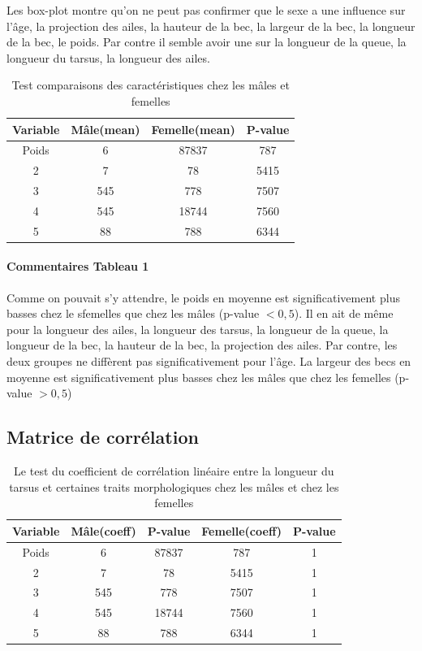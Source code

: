 \documentclass[12pt, twocolumn]{article}
\begin{document}
Les box-plot montre qu'on ne peut pas confirmer que le sexe a une influence sur l'âge, la projection des ailes, la hauteur de la bec, la largeur de la bec, la longueur de la bec, le poids.
Par contre il semble avoir une sur la longueur de la queue, la longueur du tarsus, la longueur des ailes.

\begin{table}[h!]
    \centering
    \begin{tabular}{||c c c c||} 
     \hline
     Variable & Mâle(mean) & Femelle(mean) & P-value \\ [0.5ex] 
     \hline\hline
     Poids & 6 & 87837 & 787 \\ 
     2 & 7 & 78 & 5415 \\
     3 & 545 & 778 & 7507 \\
     4 & 545 & 18744 & 7560 \\
     5 & 88 & 788 & 6344 \\ [0.5ex] 
     \hline
    \end{tabular}
    \caption{Test comparaisons des caractéristiques chez les mâles et femelles}
    \label{table:1}
\end{table}

\paragraph{Commentaires Tableau 1}
Comme on pouvait s'y attendre, le poids en moyenne est significativement plus basses chez le sfemelles que chez les mâles (p-value $< 0,5$).
Il en ait de même pour la longueur des ailes, la longueur des tarsus, la longueur de la queue, la longueur de la bec, la hauteur de la bec, la projection des ailes.
Par contre, les deux groupes ne diffèrent pas significativement pour l'âge. La largeur des becs en moyenne est significativement plus basses chez les mâles que chez les femelles (p-value $> 0,5$)

\newpage

\subsection{Matrice de corrélation}

\begin{table}[h!]
    \centering
    \begin{tabular}{||c c c c c||} 
     \hline
     Variable & Mâle(coeff) & P-value & Femelle(coeff) & P-value \\ [0.5ex] 
     \hline\hline
     Poids & 6 & 87837 & 787 & 1\\ 
     2 & 7 & 78 & 5415 & 1\\
     3 & 545 & 778 & 7507 & 1\\
     4 & 545 & 18744 & 7560 & 1\\
     5 & 88 & 788 & 6344 & 1\\ [0.5ex] 
     \hline
    \end{tabular}
    \caption{Le test du coefficient de corrélation linéaire entre la longueur du tarsus et certaines traits morphologiques chez les mâles et chez les femelles}
    \label{table:2}
\end{table}
\end{document}
